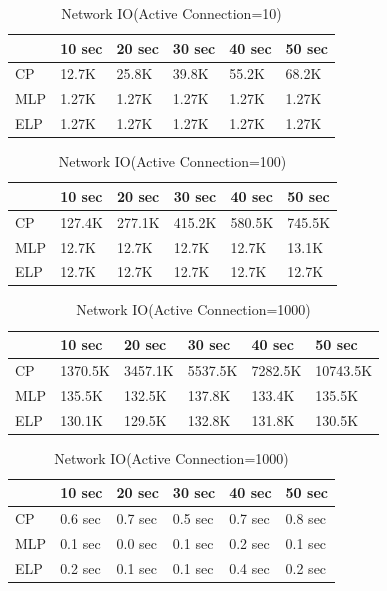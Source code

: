 \begin{table}
\centering \caption{\label{tb:traffic} Network IO(Active Connection=10)}
\begin{tabular}{|l|l|l|l|l|l|}
    \hline  & 10 sec & 20 sec & 30 sec & 40 sec & 50 sec \\
    \hline CP & 12.7K & 25.8K & 39.8K & 55.2K & 68.2K \\
    \hline MLP & 1.27K & 1.27K & 1.27K & 1.27K & 1.27K \\
    \hline ELP & 1.27K & 1.27K & 1.27K & 1.27K & 1.27K \\
    \hline
\end{tabular}
\end{table}

\begin{table}
\centering \caption{\label{tb:traffic} Network IO(Active Connection=100)}
\begin{tabular}{|l|l|l|l|l|l|}
    \hline      & 10 sec & 20 sec & 30 sec & 40 sec & 50 sec \\
    \hline CP & 127.4K & 277.1K & 415.2K & 580.5K & 745.5K \\
    \hline MLP & 12.7K & 12.7K & 12.7K & 12.7K & 13.1K \\
    \hline ELP & 12.7K & 12.7K & 12.7K & 12.7K & 12.7K \\
    \hline
\end{tabular}
\end{table}

\begin{table}
\centering \caption{\label{tb:traffic} Network IO(Active Connection=1000)}
\begin{tabular}{|l|l|l|l|l|l|}
    \hline & 10 sec & 20 sec & 30 sec & 40 sec & 50 sec \\
    \hline CP & 1370.5K & 3457.1K & 5537.5K & 7282.5K & 10743.5K \\
    \hline MLP & 135.5K & 132.5K & 137.8K & 133.4K & 135.5K \\
    \hline ELP & 130.1K & 129.5K & 132.8K & 131.8K & 130.5K \\
    \hline
\end{tabular}
\end{table}

\begin{table}
\centering \caption{\label{tb:traffic} Network IO(Active Connection=1000)}
\begin{tabular}{|l|l|l|l|l|l|}
    \hline & 10 sec & 20 sec & 30 sec & 40 sec & 50 sec \\
    \hline CP & 0.6 sec & 0.7 sec & 0.5 sec & 0.7 sec & 0.8 sec \\
    \hline MLP & 0.1 sec & 0.0 sec & 0.1 sec & 0.2 sec & 0.1 sec \\
    \hline ELP & 0.2 sec & 0.1 sec & 0.1 sec & 0.4 sec & 0.2 sec \\
    \hline
\end{tabular}
\end{table}

